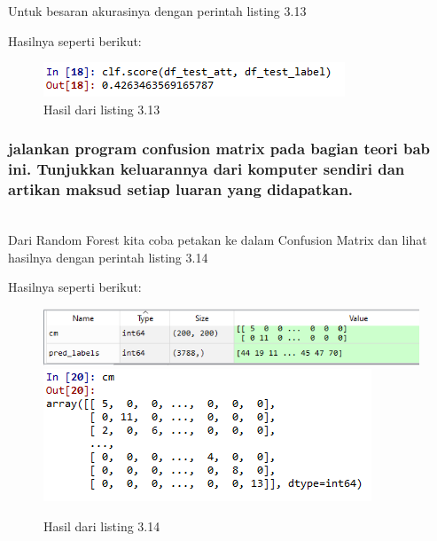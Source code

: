Untuk besaran akurasinya dengan perintah listing 3.13

Hasilnya seperti berikut:
\begin{figure}[H]
	\centering
	\includegraphics{figures/1174075/3/22.png}
	\caption{Hasil dari listing 3.13}
\end{figure}

\subsubsection{jalankan program confusion matrix pada bagian teori bab ini. Tunjukkan keluarannya dari komputer sendiri dan artikan maksud setiap luaran yang didapatkan.}
\hfill\\
Dari Random Forest kita coba petakan ke dalam Confusion Matrix dan lihat hasilnya dengan perintah listing 3.14

Hasilnya seperti berikut:
\begin{figure}[H]
	\centering
	\includegraphics[width=12cm]{figures/1174075/3/23.png}
	\includegraphics{figures/1174075/3/23a.png}
	\caption{Hasil dari listing 3.14}
\end{figure}

